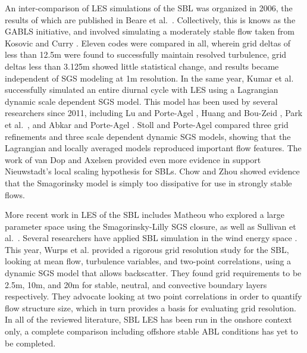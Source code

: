 \documentclass[conf]{new-aiaa}
\begin{document}
An inter-comparison of LES simulations of the SBL was organized in 2006, the
results of which are published in Beare et al.\ \cite{Beare2006}. Collectively,
this is knows as the GABLS initiative, and involved simulating a moderately
stable flow taken from Kosovic and Curry \cite{Kosovic2000}. Eleven codes
were compared in all, wherein grid deltas of less than 12.5m were found to
successfully maintain resolved turbulence, grid deltas less than 3.125m
showed little statistical change, and results became independent of SGS
modeling at 1m resolution. In the same year, Kumar et al. \cite{Kumar2006}
successfully simulated an entire diurnal cycle with LES using a Lagrangian
dynamic scale dependent SGS model. This model has been used by several
researchers since 2011, including Lu and Porte-Agel \cite{Lu2011}, Huang
and Bou-Zeid \cite{Huang2013}, Park et al.\ \cite{Park2014}, and
Abkar and Porte-Agel \cite{Abkar2015}. Stoll and Porte-Agel \cite{Stoll2007}
compared three grid refinements and three scale dependent dynamic SGS models,
showing that the Lagrangian and locally averaged models reproduced important
flow features. The work of van Dop and Axelsen \cite{vanDop2007} provided
even more evidence in support Nieuwstadt's local scaling hypothesis for SBLs.
Chow and Zhou \cite{Chow2011} showed evidence that the Smagorinsky model is
simply too dissipative for use in strongly stable flows.

More recent work in LES of the SBL includes Matheou \cite{Matheou2016} who
explored a large parameter space using the Smagorinsky-Lilly SGS
closure, as well as Sullivan et al.\ \cite{sullivan2016turbulent}. Several researchers
have applied SBL simulation in the wind energy space \cite{Aitken2014, Abkar2015, Ghaisas2017}.
This year, Wurps et al. \cite{Wurps2020} provided a rigorous grid resolution study for the SBL,
looking at mean flow, turbulence variables, and two-point correlations, using a dynamic
SGS model that allows backscatter. They found grid requirements to be 2.5m, 10m, and 20m
for stable, neutral, and convective boundary layers respectively. They advocate looking
at two point correlations in order to quantify flow structure size, which in turn
provides a basis for evaluating grid resolution. In all of the reviewed literature, SBL LES
has been run in the onshore context only, a complete comparison
including offshore stable ABL conditions has yet to be completed.
\end{document}
